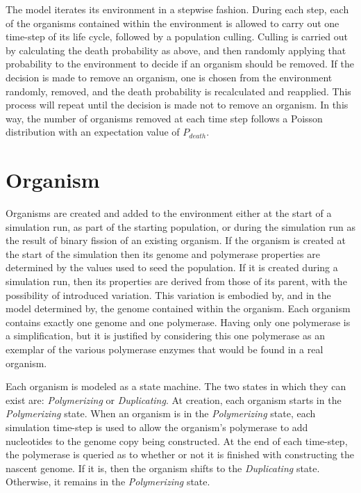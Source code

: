 The model iterates its environment in a stepwise fashion. During each step, each of the organisms contained within the environment is allowed to carry out one time-step of its life cycle, followed by a population culling. Culling is carried out by calculating the death probability as above, and then randomly applying that probability to the environment to decide if an organism should be removed. If the decision is made to remove an organism, one is chosen from the environment randomly, removed, and the death probability is recalculated and reapplied. This process will repeat until the decision is made not to remove an organism. In this way, the number of organisms removed at each time step follows a Poisson distribution with an expectation value of $P_{death}$.

\section*{Organism} %
\label{sec:organism}
Organisms are created and added to the environment either at the start of a simulation run, as part of the starting population, or during the simulation run as the result of binary fission of an existing organism. If the organism is created at the start of the simulation then its genome and polymerase properties are determined by the values used to seed the population. If it is created during a simulation run, then its properties are derived from those of its parent, with the possibility of introduced variation. This variation is embodied by, and in the model determined by, the genome contained within the organism. Each organism contains exactly one genome and one polymerase. Having only one polymerase is a simplification, but it is justified by considering this one polymerase as an exemplar of the various polymerase enzymes that would be found in a real organism.

Each organism is modeled as a state machine. The two states in which they can exist are: \emph{Polymerizing} or \emph{Duplicating}. At creation, each organism starts in the \emph{Polymerizing} state. When an organism is in the \emph{Polymerizing} state, each simulation time-step is used to allow the organism's polymerase to add nucleotides to the genome copy being constructed. At the end of each time-step, the polymerase is queried as to whether or not it is finished with constructing the nascent genome. If it is, then the organism shifts to the \emph{Duplicating} state. Otherwise, it remains in the \emph{Polymerizing} state.

